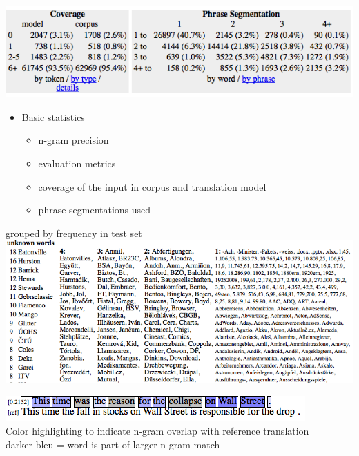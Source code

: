 \documentclass[landscape]{uedslides2C}
\begin{document}

\begin{center}
\includegraphics[scale=1]{analysis-stats.png}
\end{center}
\begin{itemize}
\item Basic statistics
\begin{itemize}
\item n-gram precision
\item evaluation metrics
\item coverage of the input in corpus and translation model
\item phrase segmentations used
\end{itemize}
\end{itemize}


\begin{center}
grouped by frequency in test set\\[5mm]
\includegraphics[scale=1]{analysis-unknown.png}
\end{center}


\vspace{30mm}
\begin{center}
\includegraphics[scale=1.5]{analysis-bleu.png}\\[20mm]
Color highlighting to indicate n-gram overlap with reference translation\\[5mm]
darker bleu = word is part of larger n-gram match
\end{center}
\end{document}
